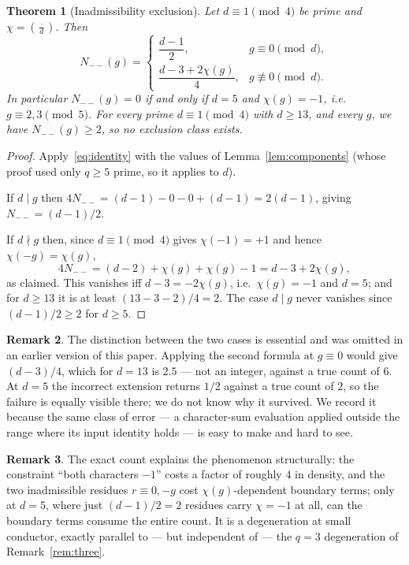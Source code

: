 \documentclass[11pt,reqno]{amsart}
\theoremstyle{plain}
\newtheorem{theorem}{Theorem}
\theoremstyle{definition}
\newtheorem{remark}[theorem]{Remark}
\newcommand{\Leg}[2]{\left(\frac{#1}{#2}\right)}
\begin{document}
\begin{theorem}[Inadmissibility exclusion]
\label{thm:inadmissible}
Let $d \equiv 1 \pmod 4$ be prime and $\chi = \Leg{\cdot}{d}$. Then
\[
  N_{--}(g) =
  \begin{cases}
    \dfrac{d-1}{2}, & g \equiv 0 \pmod d,\\[8pt]
    \dfrac{d - 3 + 2\chi(g)}{4}, & g \not\equiv 0 \pmod d.
  \end{cases}
\]
In particular $N_{--}(g) = 0$ if and only if $d = 5$ and $\chi(g) = -1$,
i.e.\ $g \equiv 2, 3 \pmod 5$. For every prime $d \equiv 1 \pmod 4$ with
$d \ge 13$, and every $g$, we have $N_{--}(g) \ge 2$, so no exclusion class
exists.
\end{theorem}

\begin{proof}
Apply~\eqref{eq:identity} with the values of Lemma~\ref{lem:components} (whose
proof used only $q \ge 5$ prime, so it applies to $d$).

If $d \mid g$ then $4N_{--} = (d-1) - 0 - 0 + (d-1) = 2(d-1)$, giving
$N_{--} = (d-1)/2$.

If $d \nmid g$ then, since $d \equiv 1 \pmod 4$ gives $\chi(-1) = +1$ and hence
$\chi(-g) = \chi(g)$,
\[
  4 N_{--} = (d-2) + \chi(g) + \chi(g) - 1 = d - 3 + 2\chi(g),
\]
as claimed. This vanishes iff $d - 3 = -2\chi(g)$, i.e.\ $\chi(g) = -1$ and
$d = 5$; and for $d \ge 13$ it is at least $(13-3-2)/4 = 2$. The case
$d \mid g$ never vanishes since $(d-1)/2 \ge 2$ for $d \ge 5$.
\end{proof}

\begin{remark}
\label{rem:hypothesis}
The distinction between the two cases is essential and was omitted in an
earlier version of this paper. Applying the second formula at $g \equiv 0$
would give $(d-3)/4$, which for $d = 13$ is $2.5$ --- not an integer, against a
true count of $6$. At $d = 5$ the incorrect extension returns $1/2$ against a true count of $2$,
so the failure is equally visible there; we do not know why it survived. We record it because
the same class of error --- a character-sum evaluation applied outside the
range where its input identity holds --- is easy to make and hard to see.
\end{remark}

\begin{remark}
The exact count explains the phenomenon structurally: the constraint
``both characters $-1$'' costs a factor of roughly $4$ in density, and the two
inadmissible residues $r \equiv 0, -g$ cost $\chi(g)$-dependent boundary
terms; only at $d = 5$, where just $(d-1)/2 = 2$ residues carry $\chi = -1$ at
all, can the boundary terms consume the entire count. It is a degeneration at
small conductor, exactly parallel to --- but independent of --- the $q = 3$
degeneration of Remark~\ref{rem:three}.
\end{remark}
\end{document}

